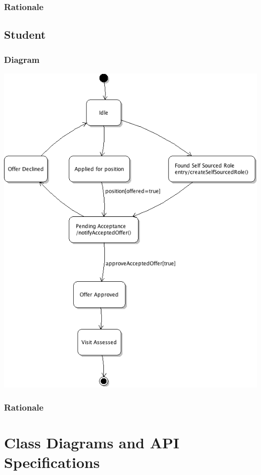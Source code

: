 \documentclass[12pt]{article}
\begin{document}
\subsubsection{Rationale}

\subsection{Student}

\subsubsection{Diagram}

\includegraphics[width=\textwidth]{studentState.png}

\subsubsection{Rationale}

\newpage

\section{Class Diagrams and API Specifications}
\end{document}
